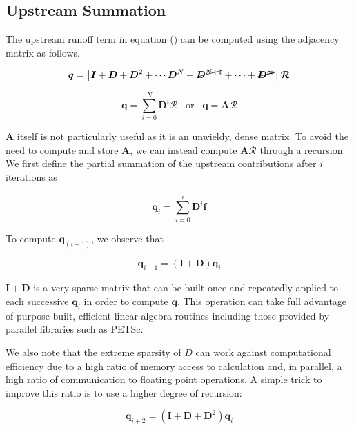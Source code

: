 \documentclass[draft,jgrga]{agu_template/AGUTeX}
\begin{document}
\subsection{Upstream Summation}

The upstream runoff term in equation () can be computed using the adjacency matrix as follows.

\begin{equation}
    \bm{q} = \left[ \bm{I} +
                    \bm{D} +
                    \bm{D}^2 + \cdots
                    \bm{D}^N +
                    \cancel{\bm{D}^{N+1}} + \cdots +
                    \cancel{\bm{D}^{\infty}}
                    \right] \bm{\mathcal R}
\end{equation}

\begin{equation}
            \bm{q} =
                    \sum_{i=0}^{N} \bm{D}^i \bm{\mathcal R}  \;\;\; \textrm{or} \;\;\;
    \bm{q} = \bm{A} \bm{\mathcal R}
\end{equation}

$\bm{A}$ itself is not particularly useful as it is an unwieldy, dense matrix. To avoid the need to compute and store $\bm{A}$, we can instead compute $\bm{A} \bm{\mathcal R}$ through a recursion. We first define the partial summation of the upstream contributions after $i$ iterations as

\begin{equation}
     \bm{q}_i = \sum_{i=0}^{i} \bm{D}^i \bm{f}
\end{equation}

To compute $\bm{q}_(i+1)$, we observe that

\begin{equation}
     \bm{q}_{i+1} = (\bm{I} + \bm{D}) \bm{q}_i
\end{equation}

$\bm{I}+\bm{D}$ is a very sparse matrix that can be built once and repeatedly applied to each successive $ \bm{q}_i$ in order to compute $\bm{q}$. This operation can take full advantage of purpose-built, efficient linear algebra routines including those provided by parallel libraries such as PETSc.

We also note that the extreme sparsity of $D$ can work against computational efficiency due to a high ratio of memory access to calculation and, in parallel, a high ratio of communication to floating point operations. A simple trick to improve this ratio is to use a higher degree of recursion:

\begin{equation}
    \bm{q}_{i+2} = (    \bm{I} +
                        \bm{D} +
                        \bm{D}^2 )
                                \bm{q}_i
\end{equation}
\end{document}
